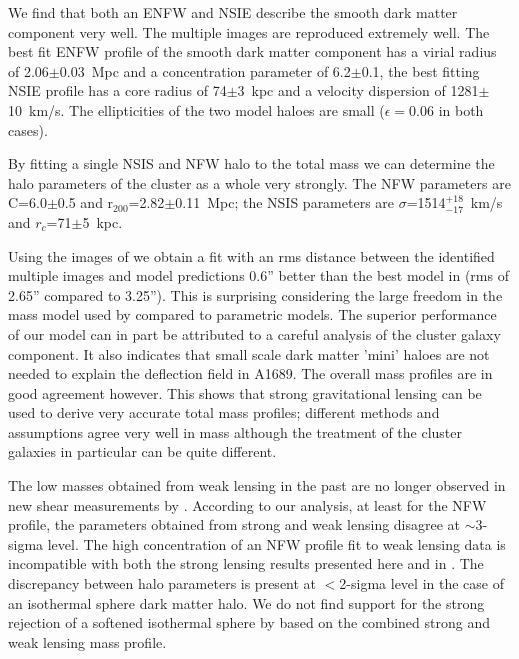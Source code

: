 \documentclass[useAMS,usenatbib]{mn2e}
\newcounter{one}   \setcounter{one}{1}
\newcounter{two}   \setcounter{two}{2}
\begin{document}
We find that both an ENFW and NSIE describe the smooth dark matter
component very well. The multiple images are reproduced extremely
well. The best fit ENFW profile of the smooth dark matter component
has a virial radius of 2.06$\pm$0.03~Mpc and a concentration parameter
of 6.2$\pm$0.1, the best fitting NSIE profile has a core radius of
74$\pm$3~kpc and a velocity dispersion of 1281$\pm$10~km/s. The
ellipticities of the two model haloes are small ($\epsilon=0.06$ in
both cases).

By fitting a single NSIS and NFW halo to the total mass we can
determine the halo parameters of the cluster as a whole very
strongly. The NFW parameters are C=6.0$\pm$0.5 and
r$_{200}$=2.82$\pm$0.11~Mpc; the NSIS parameters are
$\sigma$=1514$_{-17}^{+18}$~km/s and $r_c$=71$\pm$5~kpc.

Using the images of \citet{broadhurst:05} we obtain a fit with an rms
distance between the identified multiple images and model predictions
0.6'' better than the best model in \citet{broadhurst:05} (rms of
2.65'' compared to 3.25''). This is surprising considering the large
freedom in the mass model used by \citet{broadhurst:05} compared to
parametric models. The superior performance of our model can in part
be attributed to a careful analysis of the cluster galaxy
component. It also indicates that small scale dark matter 'mini'
haloes are not needed to explain the deflection field in A1689. The
overall mass profiles are in good agreement however. This shows that
strong gravitational lensing can be used to derive very accurate total
mass profiles; different methods and assumptions agree very well in
mass although the treatment of the cluster galaxies in particular can
be quite different.

The low masses obtained from weak lensing in the past are no longer
observed in new shear measurements by
\citet{broadhurst:05b}. According to our analysis, at least for the
NFW profile, the parameters obtained from strong and weak lensing
disagree at $\sim$3-sigma level. The high concentration of an NFW
profile fit to weak lensing data is incompatible with both the strong
lensing results presented here and in \citet{broadhurst:05}. The
discrepancy between halo parameters is present at $<$2-sigma level in
the case of an isothermal sphere dark matter halo. We do not find
support for the strong rejection of a softened isothermal sphere by
\citet{broadhurst:05b} based on the combined strong and weak lensing
mass profile.\\
\end{document}
